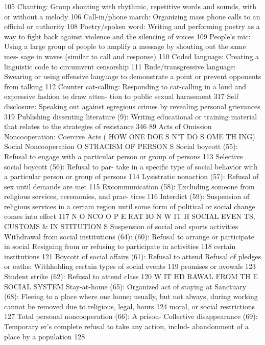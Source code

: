 \documentclass[twoside,a4paper,12pt,fleqn,openany]{extbook}
\begin{document}
 105
Chanting: Group shouting with rhythmic,
repetitive words and sounds, with or without a
melody
 106
Call-in/phone march: Organizing mass phone
calls to an official or authority
 108
Poetry/spoken word: Writing and performing
poetry as a way to fight back against violence
and the silencing of voices
 109
People’s mic: Using a large group of people to
amplify a message by shouting out the same mes-
sage in waves (similar to call and response) 110
Coded language: Creating a linguistic code to
circumvent censorship
 111
Rude/transgressive language: Swearing or
using offensive language to demonstrate a
point or prevent opponents from talking 112
Counter cat-calling: Responding to cat-calling
in a loud and expressive fashion to draw atten-
tion to public sexual harassment
 317
Self disclosure: Speaking out against egregious
crimes by revealing personal grievances 319
Publishing dissenting literature (9): Writing
educational or training material that relates to
the strategies of resistance
 346
89
Acts of Omission
Noncooperation: Coercive Acts
( HOW ONE DOE S N’T DO S OME TH ING)
Social Noncooperation
O STRACISM OF PERSON S
Social boycott (55): Refusal to engage with a
particular person or group of persons
 113
Selective social boycott (56): Refusal to par-
take in a specific type of social behavior with a
particular person or group of persons
 114
Lysistratic nonaction (57): Refusal of sex until
demands are met
 115
Excommunication (58): Excluding someone
from religious services, ceremonies, and prac-
tices
 116
Interdict (59): Suspension of religious services
in a certain region until some form of political
or social change comes into effect
 117
N O NCO O P E RAT IO N W IT H SOCIAL EVEN TS, CUSTOMS & IN STITUTION S
Suspension of social and sports activities
 Withdrawal from social institutions (64):
(60): Refusal to arrange or participate in social
 Resigning from or refusing to participate in
activities
 118
 certain institutions
 121
Boycott of social affairs (61): Refusal to attend
 Refusal of pledges or oaths: Withholding
certain types of social events
 119
 promises or avowals
 123
Student strike (62): Refusal to attend class		
120
W IT HD RAWAL FROM TH E SOCIAL SYSTEM
Stay-at-home (65): Organized act of staying at
 Sanctuary (68): Fleeing to a place where one
home; usually, but not always, during working
 cannot be removed due to religious, legal,
hours
 124
 moral, or social restrictions
 127
Total personal noncooperation (66): A prison-
 Collective disappearance (69): Temporary
er’s complete refusal to take any action, includ-
 abandonment of a place by a population 128
\end{document}
